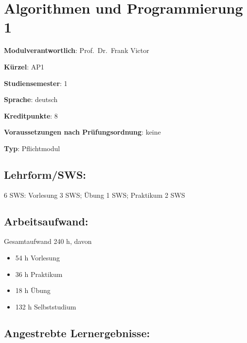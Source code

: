 \chapter{Algorithmen und Programmierung
1}\label{algorithmen-und-programmierung-1}

\begin{modulHead}
\textbf{Modulverantwortlich}: Prof.~Dr.~Frank
Victor
\end{modulHead}
\begin{modulHead}
\textbf{Kürzel}:
AP1
\end{modulHead}
\begin{modulHead}
\textbf{Studiensemester}:
1
\end{modulHead}
\begin{modulHead}
\textbf{Sprache}:
deutsch
\end{modulHead}
\begin{modulHead}
\textbf{Kreditpunkte}:
8
\end{modulHead}
\begin{modulHead}
\textbf{Voraussetzungen nach
Prüfungsordnung}: keine
\end{modulHead}
\begin{modulHead}
\textbf{Typ}:
Pflichtmodul
\end{modulHead}


\section*{Lehrform/SWS:}\label{lehrformsws}

6 SWS: Vorlesung 3 SWS; Übung 1 SWS; Praktikum 2 SWS

\section*{Arbeitsaufwand:}\label{arbeitsaufwand}

Gesamtaufwand 240 h, davon

\begin{itemize}
\tightlist
\item
  54 h Vorlesung
\item
  36 h Praktikum
\item
  18 h Übung
\item
  132 h Selbststudium
\end{itemize}

\section*{Angestrebte
Lernergebnisse:}\label{angestrebte-lernergebnisse}

